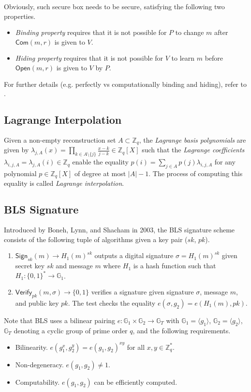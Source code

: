 \documentclass[letterpaper,twocolumn,10pt]{article}
\theoremstyle{definition}
\theoremstyle{remark}
\begin{document}
Obviously, such secure box needs to be secure, satisfying the following two properties.
\begin{itemize}
\item \textit{Binding property} requires that it is not possible for $P$ to change $m$ after $\mathsf{Com}(m, r)$ is given to $V$.
\item \textit{Hiding property} requires that it is not possible for $V$ to learn $m$ before $\mathsf{Open}(m, r)$ is given to $V$ by $P$.
\end{itemize}

For further details (e.g. perfectly vs computationally binding and hiding), refer to \cite{damgaard1998commitment}.

\subsection{Lagrange Interpolation}
\label{appendix:lagrange}
Given a non-empty reconstruction set $A \subset \mathbb{Z}_q$, the \textit{Lagrange basis polynomials} are given by $\lambda_{j, A}(x) = \prod_{k \in A \setminus \{j\}} \frac{x - k}{j - k} \in \mathbb{Z}_q[X]$ such that the \textit{Lagrange coefficients} $\lambda_{i, j, A} = \lambda_{j, A}(i) \in \mathbb{Z}_q$ enable the equality $p(i) = \sum_{j \in A} p(j) \lambda_{i, j, A}$ for any polynomial $p \in \mathbb{Z}_q[X]$ of degree at most $|A| - 1$. The process of computing this equality is called \textit{Lagrange interpolation}.

\subsection{BLS Signature}
\label{appendix:bls}
Introduced by Boneh, Lynn, and Shacham in 2003, the BLS signature scheme \cite{boneh2001short} consists of the following tuple of algorithms given a key pair ($sk$, $pk$).
\begin{enumerate}
\item $\mathsf{Sign}_{sk}(m) \rightarrow H_1(m)^{sk}$ outputs a digital signature $\sigma = H_1(m)^{sk}$ given secret key $sk$ and message $m$ where $H_1$ is a hash function such that $H_1: \{0, 1\}^* \rightarrow \mathbb{G}_1$.
\item $\mathsf{Verify}_{pk}(m, \sigma) \rightarrow \{0, 1\}$ verifies a signature given signature $\sigma$, message $m$, and public key $pk$. The test checks the equality $e(\sigma, g_2) = e(H_1(m), pk)$.
\end{enumerate}
Note that BLS uses a bilinear pairing $e: \mathbb{G}_1 \times \mathbb{G}_2 \rightarrow \mathbb{G}_T$ with $\mathbb{G}_1 = \langle g_1 \rangle$, $\mathbb{G}_2 = \langle g_2 \rangle$, $\mathbb{G}_T$ denoting a cyclic group of prime order $q$, and the following requirements.
\begin{itemize}
\item Bilinearity. $e(g_1^x, g_2^y) = e(g_1, g_2)^{x y}$ for all $x, y \in \mathbb{Z}^*_q$.
\item Non-degeneracy. $e(g_1, g_2) \neq 1$.
\item Computability. $e(g_1, g_2)$ can be efficiently computed.
\end{itemize}
\end{document}
